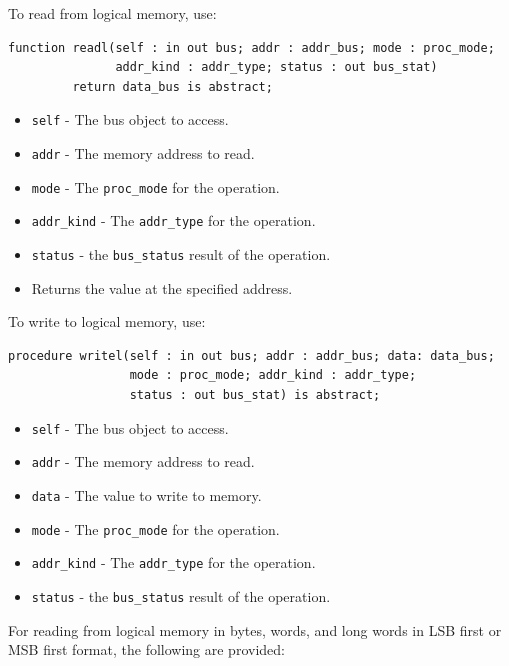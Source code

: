 \documentclass[10pt, openany]{book}
\newcommand{\keyword}[1]{\texttt{#1}}
\newcommand{\datatype}[1]{\texttt{#1}}
\begin{document}
To read from logical memory, use:
\begin{lstlisting}
function readl(self : in out bus; addr : addr_bus; mode : proc_mode;
               addr_kind : addr_type; status : out bus_stat)
         return data_bus is abstract;
\end{lstlisting}
\begin{itemize}
  \item \keyword{self} - The bus object to access.
  \item \keyword{addr} - The memory address to read.
  \item \keyword{mode} - The \datatype{proc\_mode} for the operation.
  \item \keyword{addr\_kind} - The \datatype{addr\_type} for the operation.
  \item \keyword{status} - the \datatype{bus\_status} result of the operation.
  \item Returns the value at the specified address.
\end{itemize}

To write to logical memory, use:
\begin{lstlisting}
procedure writel(self : in out bus; addr : addr_bus; data: data_bus;
                 mode : proc_mode; addr_kind : addr_type;
                 status : out bus_stat) is abstract;
\end{lstlisting}
\begin{itemize}
  \item \keyword{self} - The bus object to access.
  \item \keyword{addr} - The memory address to read.
  \item \keyword{data} - The value to write to memory.
  \item \keyword{mode} - The \datatype{proc\_mode} for the operation.
  \item \keyword{addr\_kind} - The \datatype{addr\_type} for the operation.
  \item \keyword{status} - the \datatype{bus\_status} result of the operation.
\end{itemize}

For reading from logical memory in bytes, words, and long words in LSB first or MSB first format, the following are provided:
\end{document}
